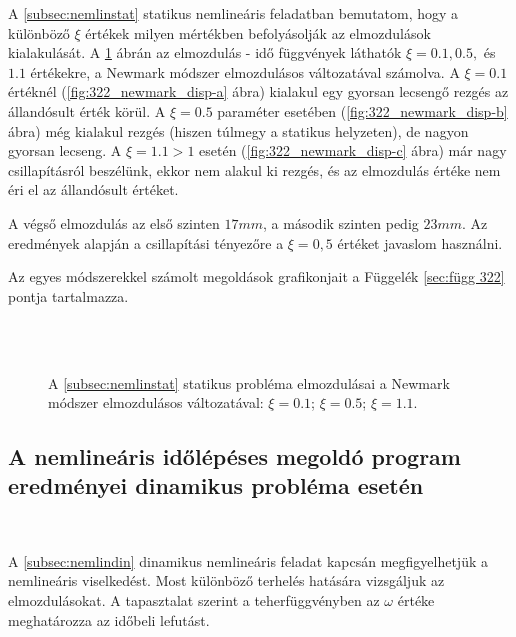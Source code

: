 A \ref{subsec:nemlinstat} statikus nemlineáris feladatban bemutatom, hogy a különböző $\xi$ értékek milyen mértékben befolyásolják az elmozdulások kialakulását. A \ref{fig:322_newmark_disp} ábrán az elmozdulás - idő függvények láthatók $\xi = 0.1, 0.5,$ és $1.1$ értékekre, a Newmark módszer elmozdulásos változatával számolva. A $\xi = 0.1$ értéknél (\ref{fig:322_newmark_disp-a} ábra) kialakul egy gyorsan lecsengő rezgés az állandósult érték körül. A $\xi = 0.5$ paraméter esetében (\ref{fig:322_newmark_disp-b} ábra) még kialakul rezgés (hiszen túlmegy a statikus helyzeten), de nagyon gyorsan lecseng. A $\xi = 1.1 > 1$ esetén (\ref{fig:322_newmark_disp-c} ábra) már nagy csillapításról beszélünk, ekkor nem alakul ki rezgés, és az elmozdulás értéke nem éri el az állandósult értéket.

A végső elmozdulás az első szinten $17 mm$, a második szinten pedig $23 mm$.  Az eredmények alapján a csillapítási tényezőre a  $\xi = 0,5$ értéket javaslom használni.

Az egyes módszerekkel számolt megoldások grafikonjait a Függelék \ref{sec:függ 322} pontja tartalmazza.


\begin{figure}%
\centering
{}%
\\
%
\\
%
\caption[A \ref{subsec:nemlinstat} statikus probléma elmozdulásai a Newmark módszer elmozdulásos változatával.]{A \ref{subsec:nemlinstat} statikus probléma elmozdulásai a Newmark módszer elmozdulásos változatával:
 $\xi = 0.1$;
 $\xi = 0.5$; 
  $\xi = 1.1$.}%
\label{fig:322_newmark_disp}%
\end{figure}
 


\subsection{A nemlineáris időlépéses megoldó program eredményei dinamikus probléma esetén}\label{subsec: nemlin eredmény din}

{\ }

A \ref{subsec:nemlindin} dinamikus nemlineáris feladat kapcsán  megfigyelhetjük a nemlineáris viselkedést. Most különböző terhelés hatására vizsgáljuk az elmozdulásokat. A tapasztalat szerint a teherfüggvényben az $\omega$  értéke meghatározza az időbeli lefutást.

